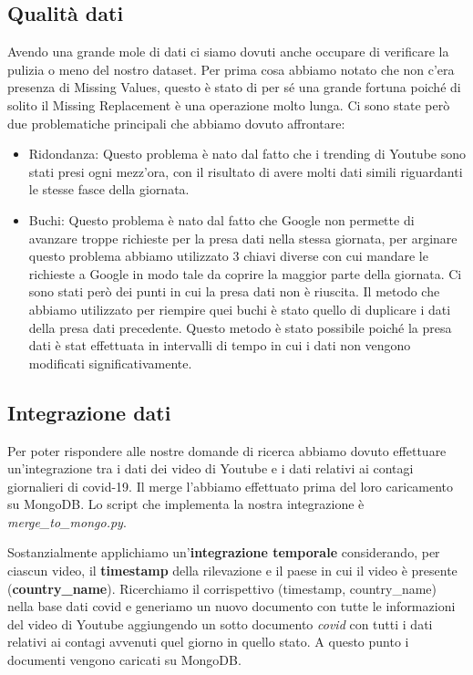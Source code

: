 \documentclass[10pt, a4paper,openany]{article}
\begin{document}
\subsection*{Qualità dati}
Avendo una grande mole di dati ci siamo dovuti anche occupare di verificare la pulizia o meno del nostro dataset. Per prima cosa abbiamo notato che non c'era presenza di Missing Values, questo è stato di per sé una grande fortuna poiché di solito il Missing Replacement è una operazione molto lunga.  Ci sono state però due problematiche principali che abbiamo dovuto affrontare:
\begin{itemize}
	\item Ridondanza: Questo problema è nato dal fatto che i trending di Youtube sono stati presi ogni mezz'ora, con il risultato di avere molti dati simili riguardanti le stesse fasce della giornata. 
	\item Buchi: Questo problema è nato dal fatto che Google non permette di avanzare troppe richieste per la presa dati nella stessa giornata, per arginare questo problema abbiamo utilizzato 3 chiavi diverse con cui mandare le richieste a Google in modo tale da coprire la maggior parte della giornata. Ci sono stati però dei punti in cui la presa dati non è riuscita. Il metodo che abbiamo utilizzato per riempire quei buchi è stato quello di duplicare i dati della presa dati precedente. Questo metodo è stato possibile poiché la presa dati è stat effettuata in intervalli di tempo in cui i dati non vengono modificati significativamente.
	
\end{itemize}

\subsection*{Integrazione dati}
	Per poter rispondere alle nostre domande di ricerca abbiamo dovuto effettuare un'integrazione tra i dati dei video di Youtube e i dati relativi ai contagi giornalieri di covid-19. Il merge l'abbiamo effettuato prima del loro caricamento su MongoDB. Lo script che implementa la nostra integrazione è \textit{merge\_to\_mongo.py}. 
	
	Sostanzialmente applichiamo un'\textbf{integrazione temporale} considerando, per ciascun video, il \textbf{timestamp} della rilevazione e il paese in cui il video è presente (\textbf{country\_name}). Ricerchiamo il corrispettivo (timestamp, country\_name) nella base dati covid e generiamo un nuovo documento con tutte le informazioni del video di Youtube aggiungendo un sotto documento \textit{covid} con tutti i dati relativi ai contagi avvenuti quel giorno in quello stato. A questo punto i documenti vengono caricati su MongoDB.
	
\end{document}
